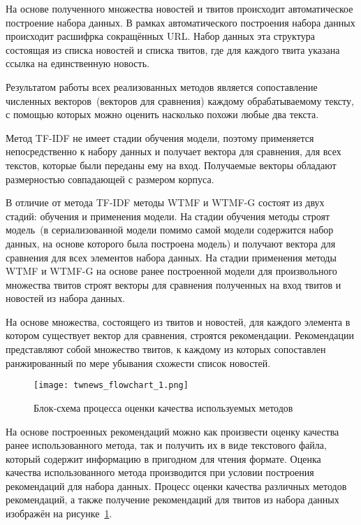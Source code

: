     На основе полученного множества новостей и твитов происходит автоматическое построение набора данных. В рамках автоматического построения набора данных происходит расшифрка сокращённых URL.
    Набор данных эта структура состоящая из списка новостей и списка твитов, где для каждого твита указана ссылка на единственную новость.

    Результатом работы всех реализованных методов является сопоставление численных векторов~(векторов для сравнения) каждому обрабатываемому тексту, с помощью которых можно оценить насколько похожи любые два текста. 

    Метод TF-IDF не имеет стадии обучения модели, поэтому применяется непосредственно к набору данных и получает вектора для сравнения, для всех текстов, которые были переданы ему на вход.
    Получаемые векторы обладают размерностью совпадающей с размером корпуса.

    В отличие от метода TF-IDF методы WTMF и WTMF-G состоят из двух стадий: обучения и применения модели. На стадии обучения методы строят модель~(в сериализованной модели помимо самой модели содержится набор данных, на основе которого была построена модель) и получают вектора для сравнения для всех элементов набора данных. На стадии применения методы WTMF и WTMF-G на основе ранее построенной модели для произвольного множества твитов строят векторы для сравнения полученных на вход твитов и новостей из набора данных.

    На основе множества, состоящего из твитов и новостей, для каждого элемента в котором существует вектор для сравнения, строятся рекомендации.
    Рекомендации представляют собой множество твитов, к каждому из которых сопоставлен ранжированный по мере убывания схожести список новостей.

    \begin{figure}[h!]
            \center
            \texttt{[image: twnews\_flowchart\_1.png]}
            \caption{Блок-схема процесса оценки качества используемых методов}
            \label{pic:twnews_flowchart_1}
    \end{figure}

    На основе построенных рекомендаций можно как произвести оценку качества ранее использованного метода, так и получить их в виде текстового файла,
    который содержит информацию в пригодном для чтения формате.
    Оценка качества использованного метода производится при условии построения рекомендаций для набора данных.
    Процесс оценки качества различных методов рекомендаций, а также получение рекомендаций для твитов из набора данных изображён на рисунке~\ref{pic:twnews_flowchart_1}.


